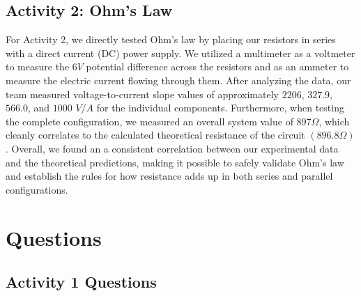 \documentclass[12pt]{article}
\begin{document}
\subsection*{Activity 2: Ohm's Law}
For Activity 2, we directly tested Ohm's law by placing our resistors in series
with a direct current (DC) power supply. We utilized a multimeter as a voltmeter
to measure the $6 V$ potential difference across the resistors and as an ammeter
to measure the electric current flowing through them. After analyzing the data,
our team measured voltage-to-current slope values of
approximately $2206$, $327.9$, $566.0$, and $1000$ $V/A$ for the individual
components. Furthermore, when testing the complete configuration, we measured an
overall system value of $897 \Omega$, which cleanly correlates to the calculated
theoretical resistance of the circuit $(896.8 \Omega)$. Overall, we found an
a consistent correlation between our experimental data and the theoretical
predictions, making it possible to safely validate Ohm's law and establish the
rules for how resistance adds up in both series and parallel configurations.

\section{Questions}

\subsection*{Activity 1 Questions}
\end{document}
